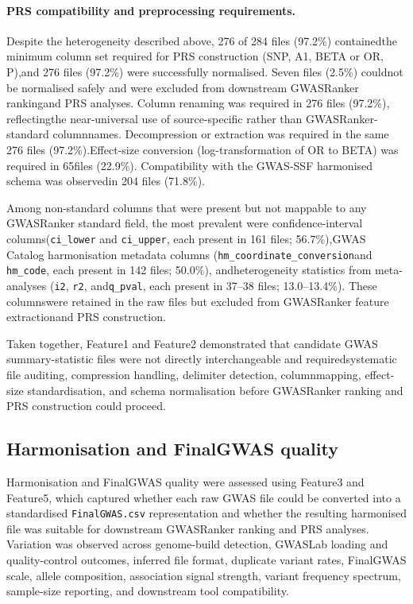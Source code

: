 \documentclass[11pt,a4paper]{article}
\begin{document}
\paragraph{PRS compatibility and preprocessing requirements.}Despite the heterogeneity described above, 276 of 284 files (97.2\%) containedthe minimum column set required for PRS construction (SNP, A1, BETA or OR, P),and 276 files (97.2\%) were successfully normalised. Seven files (2.5\%) couldnot be normalised safely and were excluded from downstream GWASRanker rankingand PRS analyses. Column renaming was required in 276 files (97.2\%), reflectingthe near-universal use of source-specific rather than GWASRanker-standard columnnames. Decompression or extraction was required in the same 276 files (97.2\%).Effect-size conversion (log-transformation of OR to BETA) was required in 65files (22.9\%). Compatibility with the GWAS-SSF harmonised schema was observedin 204 files (71.8\%).

Among non-standard columns that were present but not mappable to any GWASRanker standard field, the most prevalent were confidence-interval columns(\texttt{ci\_lower} and \texttt{ci\_upper}, each present in 161 files; 56.7\%),GWAS Catalog harmonisation metadata columns (\texttt{hm\_coordinate\_conversion}and \texttt{hm\_code}, each present in 142 files; 50.0\%), andheterogeneity statistics from meta-analyses (\texttt{i2}, \texttt{r2}, and\texttt{q\_pval}, each present in 37--38 files; 13.0--13.4\%). These columnswere retained in the raw files but excluded from GWASRanker feature extractionand PRS construction.

Taken together, Feature1 and Feature2 demonstrated that candidate GWAS summary-statistic files were not directly interchangeable and requiredsystematic file auditing, compression handling, delimiter detection, columnmapping, effect-size standardisation, and schema normalisation before GWASRanker ranking and PRS construction could proceed.

\subsection{Harmonisation and FinalGWAS quality}

Harmonisation and FinalGWAS quality were assessed using Feature3 and Feature5, which captured whether each raw GWAS file could be converted into a standardised \texttt{FinalGWAS.csv} representation and whether the resulting harmonised file was suitable for downstream GWASRanker ranking and PRS analyses. Variation was observed across genome-build detection, GWASLab loading and quality-control outcomes, inferred file format, duplicate variant rates, FinalGWAS scale, allele composition, association signal strength, variant frequency spectrum, sample-size reporting, and downstream tool compatibility.
\end{document}
